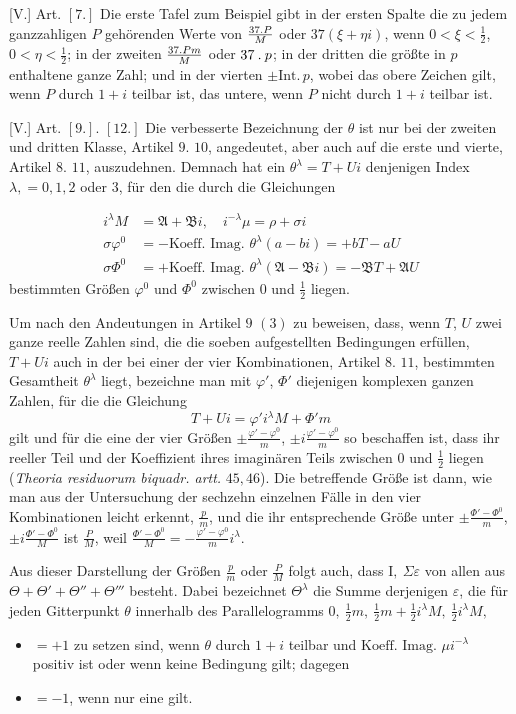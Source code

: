 [V.] Art. $[7.]$ Die erste Tafel zum Beispiel gibt in der ersten Spalte die zu jedem ganzzahligen $P$ gehörenden Werte von $\frac{37\mathbin{.} P}{M}$ oder $37(\xi+\eta i)$, wenn $0<\xi<\tfrac12$, $0<\eta<\tfrac12$; in der zweiten $\frac{37\mathbin{.} Pm}{M}$ oder $37\mathbin{.} p$; in der dritten die größte in $p$ enthaltene ganze Zahl; und in der vierten $\pm\mathrm{Int.}\,p$, wobei das obere Zeichen gilt, wenn $P$ durch $1+i$ teilbar ist, das untere, wenn $P$ nicht durch $1+i$ teilbar ist.

[V.] Art. $[9.]$. $[12.]$ Die verbesserte Bezeichnung der $\theta$ ist nur bei der zweiten und dritten Klasse, Artikel $9$. $10$, angedeutet, aber auch auf die erste und vierte, Artikel $8$. $11$, auszudehnen. Demnach hat ein $\theta^\lambda=T+Ui$ denjenigen Index $\lambda,=0,1,2$ oder $3$, für den die durch die Gleichungen

\[
\begin{aligned}
i^\lambda M&=\mathfrak A+\mathfrak B i,\quad i^{-\lambda}\mu=\rho+\sigma i\\
\sigma\varphi^0&=-\text{Koeff. Imag. }\theta^\lambda(a-bi)=+bT-aU\\
\sigma\Phi^0&=+\text{Koeff. Imag. }\theta^\lambda(\mathfrak A-\mathfrak B i)=-\mathfrak B T+\mathfrak A U
\end{aligned}
\]
bestimmten Größen $\varphi^0$ und $\Phi^0$ zwischen $0$ und $\tfrac12$ liegen.

Um nach den Andeutungen in Artikel $9$ $(3)$ zu beweisen, dass, wenn $T$, $U$ zwei ganze reelle Zahlen sind, die die soeben aufgestellten Bedingungen erfüllen, $T+Ui$ auch in der bei einer der vier Kombinationen, Artikel $8$. $11$, bestimmten Gesamtheit $\theta^\lambda$ liegt, bezeichne man mit $\varphi'$, $\Phi'$ diejenigen komplexen ganzen Zahlen, für die die Gleichung
\[
T+Ui=\varphi'i^\lambda M+\Phi'm
\]
gilt und für die eine der vier Größen $\pm\frac{\varphi'-\varphi^0}{m}$, $\pm i\frac{\varphi'-\varphi^0}{m}$ so beschaffen ist, dass ihr reeller Teil und der Koeffizient ihres imaginären Teils zwischen $0$ und $\tfrac12$ liegen (\textit{Theoria residuorum biquadr. artt.} $45,46$). Die betreffende Größe ist dann, wie man aus der Untersuchung der sechzehn einzelnen Fälle in den vier Kombinationen leicht erkennt, $\frac pm$, und die ihr entsprechende Größe unter $\pm\frac{\Phi'-\Phi^0}{m}$, $\pm i\frac{\Phi'-\Phi^0}{M}$ ist $\frac PM$, weil $\frac{\Phi'-\Phi^0}{M}=-\frac{\varphi'-\varphi^0}{m}i^\lambda$.

Aus dieser Darstellung der Größen $\frac pm$ oder $\frac PM$ folgt auch, dass $\mathrm I,\ \Sigma\varepsilon$ von allen aus $\Theta+\Theta'+\Theta''+\Theta'''$ besteht. Dabei bezeichnet $\Theta^\lambda$ die Summe derjenigen $\varepsilon$, die für jeden Gitterpunkt $\theta$ innerhalb des Parallelogramms $0,\ \tfrac12m,\ \tfrac12m+\tfrac12i^\lambda M,\ \tfrac12i^\lambda M,$
\begin{itemize}
\item[] $=+1$ zu setzen sind, wenn $\theta$ durch $1+i$ teilbar und $\text{Koeff. Imag. }\mu i^{-\lambda}$ positiv ist oder wenn keine Bedingung gilt; dagegen
\item[] $=-1$, wenn nur eine gilt.
\end{itemize}


